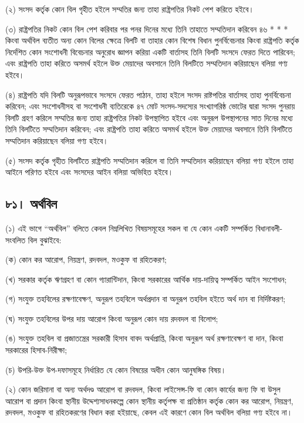 \documentclass[11pt]{article}
\begin{document}
(২) সংসদ কর্তৃক কোন বিল গৃহীত হইলে সম্মতির জন্য তাহা রাষ্ট্রপতির নিকট পেশ
    করিতে হইবে।

(৩) রাষ্ট্রপতির নিকট কোন বিল পেশ করিবার পর পনর দিনের মধ্যে তিনি তাহাতে
    সম্মতিদান করিবেন ৪৬ * * * কিংবা অর্থবিল ব্যতীত অন্য কোন বিলের ক্ষেত্রে বিলটি
    বা তাহার কোন বিশেষ বিধান পুনর্বিবেচনার কিংবা রাষ্ট্রপতি কর্তৃক নির্দেশিত কোন
    সংশোধনী বিবেচনার অনুরোধ জ্ঞাপন করিয়া একটি বার্তাসহ তিনি বিলটি সংসদে ফেরত
    দিতে পারিবেন; এবং রাষ্ট্রপতি তাহা করিতে অসমর্থ হইলে উক্ত মেয়াদের অবসানে
    তিনি বিলটিতে সম্মতিদান করিয়াছেন বলিয়া গণ্য হইবে।

(৪) রাষ্ট্রপতি যদি বিলটি অনুরূপভাবে সংসদে ফেরত পাঠান, তাহা হইলে সংসদ
    রাষ্টপতির বার্তাসহ তাহা পুনর্বিবেচনা করিবেন; এবং সংশোধনীসহ বা সংশোধনী
    ব্যতিরেকে ৪৭ মোট সংসদ-সদস্যের সংখ্যাগরিষ্ঠ ভোটের দ্বারা সংসদ পুনরায় বিলটি
    গ্রহণ করিলে সম্মতির জন্য তাহা রাষ্ট্রপতির নিকট উপস্থাপিত হইবে এবং অনুরূপ
    উপস্থাপনের সাত দিনের মধ্যে তিনি বিলটিতে সম্মতিদান করিবেন; এবং রাষ্ট্রপতি
    তাহা করিতে অসমর্থ হইলে উক্ত মেয়াদের অবসানে তিনি বিলটিতে সম্মতিদান
    করিয়াছেন বলিয়া গণ্য হইবে।

(৫) সংসদ কর্তৃক গৃহীত বিলটিতে রাষ্ট্রপতি সম্মতিদান করিলে বা তিনি সম্মতিদান
    করিয়াছেন বলিয়া গণ্য হইলে তাহা আইনে পরিণত হইবে এবং সংসদের আইন বলিয়া
    অভিহিত হইবে।

\subsection{৮১। অর্থবিল}
\label{sec:orge646edd}
(১) এই ভাগে “অর্থবিল” বলিতে কেবল নিম্নলিখিত বিষয়সমূহের সকল বা যে কোন একটি
    সম্পর্কিত বিধানাবলী-সংবলিত বিল বুঝাইবে:

(ক) কোন কর আরোপ, নিয়ন্ত্রণ, রদবদল, মওকুফ বা রহিতকরণ;

(খ) সরকার কর্তৃক ঋণগ্রহণ বা কোন গ্যারান্টিদান, কিংবা সরকারের আর্থিক
    দায়-দায়িত্ব সম্পর্কিত আইন সংশোধন;

(গ) সংযুক্ত তহবিলের রক্ষণাবেক্ষণ, অনুরূপ তহবিলে অর্থপ্রদান বা অনুরূপ তহবিল হইতে
    অর্থ দান বা নির্দিষ্টকরণ;

(ঘ) সংযুক্ত তহবিলের উপর দায় আরোপ কিংবা অনুরূপ কোন দায় রদবদল বা বিলোপ;

(ঙ) সংযুক্ত তহবিল বা প্রজাতন্ত্রের সরকারী হিসাব বাবদ অর্থপ্রাপ্তি, কিংবা অনুরূপ
    অর্থ রক্ষণাবেক্ষণ বা দান, কিংবা সরকারের হিসাব-নিরীক্ষা;

(চ) উপরি-উক্ত উপ-দফাসমূহে নির্ধারিত যে কোন বিষয়ের অধীন কোন আনুষঙ্গিক বিষয়।

(২) কোন জরিমানা বা অন্য অর্থদণ্ড আরোপ বা রদবদল, কিংবা লাইসেন্স-ফি বা কোন
    কার্যের জন্য ফি বা উসুল আরোপ বা প্রদান কিংবা স্থানীয় উদ্দেশ্যসাধনকল্পে কোন
    স্থানীয় কর্তৃপক্ষ বা প্রতিষ্ঠান কর্তৃক কোন কর আরোপ, নিয়ন্ত্রণ, রদবদল, মওকুফ বা
    রহিতকরণের বিধান করা হইয়াছে, কেবল এই কারণে কোন বিল অর্থবিল বলিয়া গণ্য
    হইবে না।
\end{document}
